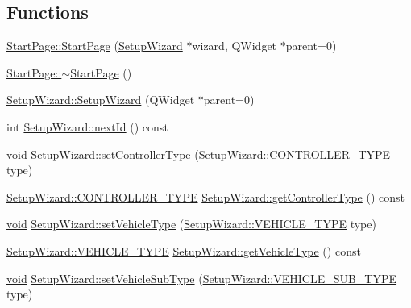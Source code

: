 \subsection*{\-Functions}
\begin{DoxyCompactItemize}
\item 
\hyperlink{group___setup_gac7f13cdee5f6c7c47763882247c4dec8}{\-Start\-Page\-::\-Start\-Page} (\hyperlink{class_setup_wizard}{\-Setup\-Wizard} $\ast$wizard, \-Q\-Widget $\ast$parent=0)
\item 
\hyperlink{group___setup_ga03a08c78d6a2b73a4fe95bfa89e74314}{\-Start\-Page\-::$\sim$\-Start\-Page} ()
\item 
\hyperlink{group___setup_ga8f260c27631b936af1a8e2a9475ae2f0}{\-Setup\-Wizard\-::\-Setup\-Wizard} (\-Q\-Widget $\ast$parent=0)
\item 
int \hyperlink{group___setup_ga7e04c785013743eebd2ceb833536568d}{\-Setup\-Wizard\-::next\-Id} () const 
\item 
\hyperlink{group___u_a_v_objects_plugin_ga444cf2ff3f0ecbe028adce838d373f5c}{void} \hyperlink{group___setup_gab45587f98cb648017f85da303efa068c}{\-Setup\-Wizard\-::set\-Controller\-Type} (\hyperlink{group___vehicle_configuration_source_ga3cfce2b0a501a6fdb7a0ae408ba63556}{\-Setup\-Wizard\-::\-C\-O\-N\-T\-R\-O\-L\-L\-E\-R\-\_\-\-T\-Y\-P\-E} type)
\item 
\hyperlink{group___vehicle_configuration_source_ga3cfce2b0a501a6fdb7a0ae408ba63556}{\-Setup\-Wizard\-::\-C\-O\-N\-T\-R\-O\-L\-L\-E\-R\-\_\-\-T\-Y\-P\-E} \hyperlink{group___setup_ga1d7c4e20ee0857aef644a2e162ce51e7}{\-Setup\-Wizard\-::get\-Controller\-Type} () const 
\item 
\hyperlink{group___u_a_v_objects_plugin_ga444cf2ff3f0ecbe028adce838d373f5c}{void} \hyperlink{group___setup_gad78d95f5556264d0ceb480487ffadfb8}{\-Setup\-Wizard\-::set\-Vehicle\-Type} (\hyperlink{group___vehicle_configuration_source_gaa97253587c69ba0d23535abdc42fad43}{\-Setup\-Wizard\-::\-V\-E\-H\-I\-C\-L\-E\-\_\-\-T\-Y\-P\-E} type)
\item 
\hyperlink{group___vehicle_configuration_source_gaa97253587c69ba0d23535abdc42fad43}{\-Setup\-Wizard\-::\-V\-E\-H\-I\-C\-L\-E\-\_\-\-T\-Y\-P\-E} \hyperlink{group___setup_gac67d395a98064dde4cd243f78cdef9d4}{\-Setup\-Wizard\-::get\-Vehicle\-Type} () const 
\item 
\hyperlink{group___u_a_v_objects_plugin_ga444cf2ff3f0ecbe028adce838d373f5c}{void} \hyperlink{group___setup_gaceb7a4422958869c876dd43842e6960c}{\-Setup\-Wizard\-::set\-Vehicle\-Sub\-Type} (\hyperlink{group___vehicle_configuration_source_gaa22bfa88d750f2b46f66702a723e8342}{\-Setup\-Wizard\-::\-V\-E\-H\-I\-C\-L\-E\-\_\-\-S\-U\-B\-\_\-\-T\-Y\-P\-E} type)

\end{DoxyCompactItemize}
